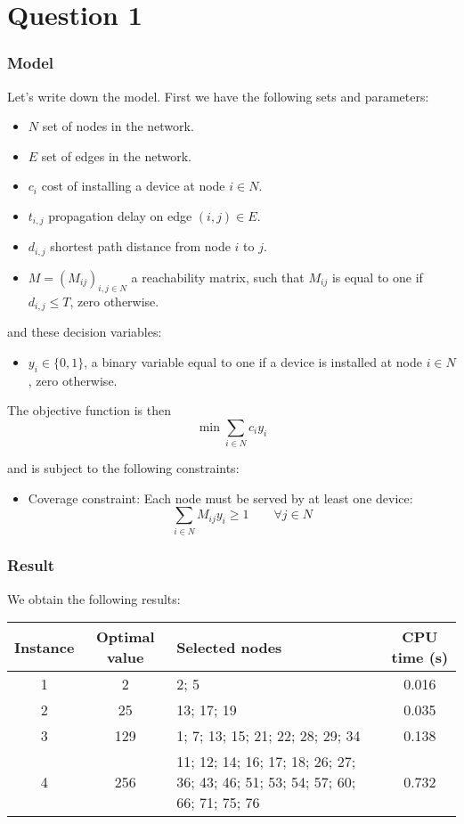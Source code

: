 \section{Question 1}

\subsubsection*{Model}
Let's write down the model. First we have the following sets and parameters:
\begin{itemize}
	\item $N$ set of nodes in the network.
	\item $E$ set of edges in the network.
	\item $c_i$ cost of installing a device at node $i \in N$.
	\item $t_{i,j}$ propagation delay on edge $(i,j) \in E$.
	\item $d_{i,j}$ shortest path distance from node $i$ to $j$.
	\item $M = (M_{ij})_{i,j \in N}$ a reachability matrix, such that $M_{ij}$ is equal to one if $d_{i,j} \le T$, zero otherwise.
\end{itemize}

and these decision variables:
\begin{itemize}
	\item $y_i \in \{0,1\}$, a binary variable equal to one if a device is installed at node $i \in N$, zero otherwise.


\end{itemize}

The objective function is then
	\[
		\min \sum_{i \in N} c_i y_i
	\]

and is subject to the following constraints:
\begin{itemize}
	\item Coverage constraint: Each node must be served by at least one device:
	\[
		\sum_{i \in N } M_{ij}y_i \ge 1 \qquad \forall j \in N
	\]

	
\end{itemize}

\newpage

\subsubsection*{Result}
We obtain the following results:

\begin{table}[h]
	\centering
	\begin{tabularx}{\textwidth}{|c|c|X|c|}
		\hline
		\textbf{Instance} & \textbf{Optimal value} & \textbf{Selected nodes} & \textbf{CPU time (s)} \\
		\hline
		1 & 2 & 2; 5 & 0.016 \\
		\hline
		2 & 25 & 13; 17; 19 & 0.035 \\
		\hline
		3 & 129 & 1; 7; 13; 15; 21; 22; 28; 29; 34 & 0.138 \\
		\hline
		4 & 256 & 11; 12; 14; 16; 17; 18; 26; 27; 36; 43; 46; 51; 53; 54; 57; 60; 66; 71; 75; 76 & 0.732 \\
		\hline
	\end{tabularx}
	\label{tab:instance_costs}
\end{table}
